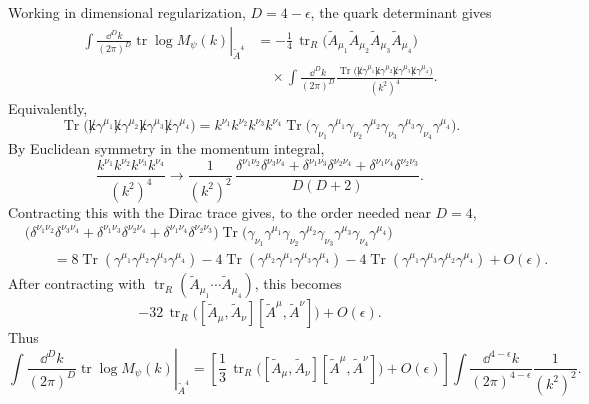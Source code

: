 Working in dimensional regularization, \(D=4-\epsilon\), the quark
determinant gives
\[
\begin{aligned}
  \left.
  \int\frac{\dd^Dk}{(2\pi)^D}
  \operatorname{tr}\log M_\psi(k)
  \right|_{\widetilde A^4}
  &=
  -\frac14\,
  \operatorname{tr}_{R}
  \bigl(
    \widetilde A_{\mu_1}\widetilde A_{\mu_2}
    \widetilde A_{\mu_3}\widetilde A_{\mu_4}
  \bigr)
\\
  &\quad\times
  \int\frac{\dd^Dk}{(2\pi)^D}
  \frac{
    \operatorname{Tr}
    \bigl(
      \not k\gamma^{\mu_1}
      \not k\gamma^{\mu_2}
      \not k\gamma^{\mu_3}
      \not k\gamma^{\mu_4}
    \bigr)
  }{(k^2)^4}.
\end{aligned}
\]
Equivalently,
\[
  \operatorname{Tr}
  \bigl(
    \not k\gamma^{\mu_1}
    \not k\gamma^{\mu_2}
    \not k\gamma^{\mu_3}
    \not k\gamma^{\mu_4}
  \bigr)
  =
  k^{\nu_1}k^{\nu_2}k^{\nu_3}k^{\nu_4}
  \operatorname{Tr}
  \bigl(
    \gamma_{\nu_1}\gamma^{\mu_1}
    \gamma_{\nu_2}\gamma^{\mu_2}
    \gamma_{\nu_3}\gamma^{\mu_3}
    \gamma_{\nu_4}\gamma^{\mu_4}
  \bigr).
\]
By Euclidean symmetry in the momentum integral,
\[
  \frac{k^{\nu_1}k^{\nu_2}k^{\nu_3}k^{\nu_4}}{(k^2)^4}
  \longrightarrow
  \frac{1}{(k^2)^2}\,
  \frac{
    \delta^{\nu_1\nu_2}\delta^{\nu_3\nu_4}
    +\delta^{\nu_1\nu_3}\delta^{\nu_2\nu_4}
    +\delta^{\nu_1\nu_4}\delta^{\nu_2\nu_3}
  }{D(D+2)}.
\]
Contracting this with the Dirac trace gives, to the order needed near
\(D=4\),
\[
\begin{aligned}
  &\bigl(
    \delta^{\nu_1\nu_2}\delta^{\nu_3\nu_4}
    +\delta^{\nu_1\nu_3}\delta^{\nu_2\nu_4}
    +\delta^{\nu_1\nu_4}\delta^{\nu_2\nu_3}
  \bigr)
  \operatorname{Tr}
  \bigl(
    \gamma_{\nu_1}\gamma^{\mu_1}
    \gamma_{\nu_2}\gamma^{\mu_2}
    \gamma_{\nu_3}\gamma^{\mu_3}
    \gamma_{\nu_4}\gamma^{\mu_4}
  \bigr)
\\
  &\qquad =
  8\operatorname{Tr}
    (\gamma^{\mu_1}\gamma^{\mu_2}
     \gamma^{\mu_3}\gamma^{\mu_4})
  -4\operatorname{Tr}
    (\gamma^{\mu_2}\gamma^{\mu_1}
     \gamma^{\mu_3}\gamma^{\mu_4})
  -4\operatorname{Tr}
    (\gamma^{\mu_1}\gamma^{\mu_3}
     \gamma^{\mu_2}\gamma^{\mu_4})
  +O(\epsilon).
\end{aligned}
\]
After contracting with
\(\operatorname{tr}_{R}(\widetilde A_{\mu_1}\cdots
\widetilde A_{\mu_4})\), this becomes
\[
  -32\,
  \operatorname{tr}_{R}
  \bigl(
    [\widetilde A_\mu,\widetilde A_\nu]
    [\widetilde A^\mu,\widetilde A^\nu]
  \bigr)
  +O(\epsilon).
\]
Thus
\[
  \left.
  \int\frac{\dd^Dk}{(2\pi)^D}
  \operatorname{tr}\log M_\psi(k)
  \right|_{\widetilde A^4}
  =
  \left[
    \frac13\,
    \operatorname{tr}_{R}
    \bigl(
      [\widetilde A_\mu,\widetilde A_\nu]
      [\widetilde A^\mu,\widetilde A^\nu]
    \bigr)
    +O(\epsilon)
  \right]
  \int\frac{\dd^{4-\epsilon}k}{(2\pi)^{4-\epsilon}}
  \frac{1}{(k^2)^2}.
\]
